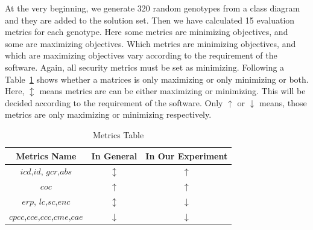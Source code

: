 \documentclass[letterpaper, 10 pt, conference]{ieeeconf}  %
\begin{document}
At the very beginning, we generate 320 random genotypes from a class diagram and they are added to the solution set. Then we have calculated 15 evaluation metrics for each genotype. Here some metrics are minimizing objectives, and some are maximizing objectives. Which metrics are minimizing objectives, and which are maximizing objectives vary according to the requirement of the software. Again, all security metrics must be set as minimizing. Following a Table~\ref{tb:metrics table} shows whether a matrices is only maximizing or only minimizing or both. 
Here, $\updownarrow$ means metrics are can  be either maximizing or minimizing. This will be decided according to the requirement of the software. Only $\uparrow$ or $\downarrow$ means, those metrics are only maximizing or minimizing respectively.  
\begin{table}[!h]
\caption{Metrics Table}

\begin{center}

\begin{tabular}{ |c|c|c| } 



 \hline
 Metrics Name & In General & In Our Experiment\\ \hline
$icd$,$id$, $gcr$,$abs$ &  $\updownarrow$  & $\uparrow$ \\ \hline
$coc$ & $\uparrow$ &  $\uparrow$ \\ \hline
$erp$, $lc$,$sc$,$enc$  & $\updownarrow$ &  $\downarrow$\\ \hline
$cpcc$,$cce$,$ccc$,$cme$,$cae$ & \textbf{$\downarrow$} & $\downarrow$ \\ \hline


\end{tabular}

\end{center}
\label{tb:metrics table}

\end{table}
\end{document}
